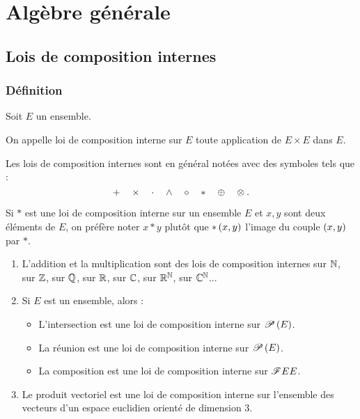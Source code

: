 \chapter{Algèbre générale}

\minitoc

\section{Lois de composition internes}

\subsection{Définition}

\begin{defi}
Soit \(E\) un ensemble.

On appelle loi de composition interne sur \(E\) toute application de \(E\times E\) dans \(E\).
\end{defi}

\begin{rem}
Les lois de composition internes sont en général notées avec des symboles tels que : \[+\quad\times\quad\cdot\quad\land\quad\rond\quad*\quad\oplus\quad\otimes.\]

Si \(*\) est une loi de composition interne sur un ensemble \(E\) et \(x,y\) sont deux éléments de \(E\), on préfère noter \(x*y\) plutôt que \(*\paren{x,y}\) l'image du couple \(\paren{x,y}\) par \(*\).
\end{rem}

\begin{ex}
\begin{enumerate}
\item L'addition et la multiplication sont des lois de composition internes sur \(\N\), sur \(\Z\), sur \(\Q\), sur \(\R\), sur \(\C\), sur \(\R^\N\), sur \(\C^\N\)... \\

\item Si \(E\) est un ensemble, alors : \begin{itemize}
\item L'intersection est une loi de composition interne sur \(\P{E}\). \\

\item La réunion est une loi de composition interne sur \(\P{E}\). \\

\item La composition est une loi de composition interne sur \(\F{E}{E}\). \\
\end{itemize}

\item Le produit vectoriel est une loi de composition interne sur l'ensemble des vecteurs d'un espace euclidien orienté de dimension 3. \\
\end{enumerate}
\end{ex}

